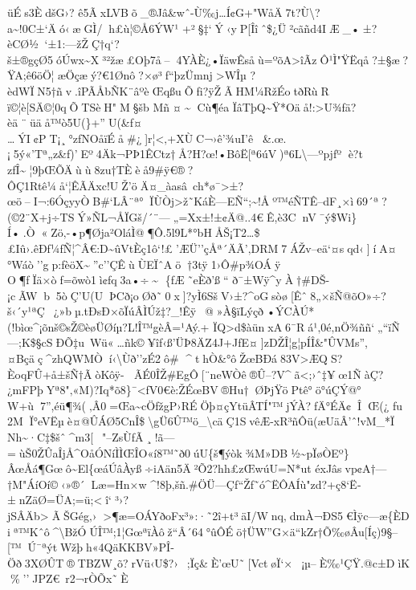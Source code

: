 üÉs3ÈdšG›?
ê5ÃxLVBõ\_®Jâ\&wˆ-Ù‰j\ldots Í¢G+"WåÄ7t?Ù\textbackslash?a\textasciitilde!0C±`Äó‹æGÌ/h£ù¦©Å6ÝW¹
+²§‡`Ý‹\textbar yP{[}Îîˆ\$¿Ü²cãñd4IÆ\_•±?èCØ½`±1:---žŽÇ†q`?š±®gçØ5óÚwx\textasciitilde X³²žæ£Oþ7å--4YÀÈ¿•ÏäwÊsåù=ºõA\textgreater îÃzÔ¹Ì"ŸËqå?±§æ?ŸA;ê6öÖ¦æÖçæý?€1Ønô?×ø³ ƒ``þzÜmnj\textgreater WÎµ
?èdWÏN5†ñv.îPÃÅbÑK¨âºèŒqßuÕƒi?ÿŽÃHM¼RžÉotðRùR ï©¦è{[}SÄ©¦0qÕTSèH"M§šb
Mñ¤\textasciitildeCù¶éa
ÏâTþQ\textasciitilde\textquotesingle Ÿ*Oäå!:\textgreater U¾fä?èä¨üäå™ò5U(\}+''U(\&f¤
\ldots*Ý I¢PT¡¸°zƒNOåïÉå\#¿{]}r¦\textless‚+XÙC¬›ê'¾uI'ê\&.œ.¡5ý«'T ª„z\&ƒ)'Eº4Äk¬PÞ1ÊCtz†Å?H?œ!•BôË{[}ª6úV)ª6L\textbackslash---ºpjƒº
è?t
zƒÎ\textasciitilde{}¦9þŒÕÄùù8zu†TÈèå9\#ÿ€®?ÔÇ1R\textquotesingle tê¼å`¦ÊÃÄxc!UŽ'öÄ¤\_àasâ~ch*ø¯\textgreater±?œö--I¬:6ÓçyyÒB\#`LÂ¨ª°ÏÙÒj\textgreater ž˜KáÈ---EÑ``;\textasciitilde!Åº™éÑTÊ--dF¸×ì69´ª?(©2¨X+j÷TSÝ»ÑL¬ÅÏGš/´¨---„=Xx±!±¢Ä@..4€Ê,è3CnV¯ý\$Wi\}Í•.Ò«Zö‚-•p¶Øja²OláÌ@¶Ô.5l9L*°bHÅŠ¡T2\ldots\$£Iû›.êÐf¼ƒÑ¦\^{}Â€:D\textasciitilde ûVtÈç1ô`!£'ÆÜ''çÅª´ÄÃ'‚DRM7ÁŽv--eä`¤sqd‹{]}íA¤°Wáò''gp:ƒèöX\textasciitilde''c''ÇÊùÙEÏˆAö†3tÿ1›Ô\#p¾OÁÿ
O¶fÏä×òƒ=õwò1ì¢fq3a•÷\textasciitilde{} \{ƒÆ˜eÈð'ß``
ð¯±Wÿ\^{}yÀ†\#DŠ-¡cÃWb5òÇ'U(UÞCð¡oØð˜0x{]}?yÌ6SšV›±?\^{}oGsòø{[}Êˆ8„×šÑ@õO»÷?š‹´y¹ªÇ~¿»bµ.tÐsÐ×õÏúÂÌÚž‡?\_!Êÿ~@» À§ïLýçð•ÝCÀÚ*(!bìœ\^{}¡õnš©sŽ©èøÜ\textbar Øíµ?L!Î™gèÂ=¹Aý.+
ÏQ\textgreater d\$àünxA6¯Rá¹‚0é‚nÖ¾ññ`„``ïÑ---;K\$§cSÐÕ‡u~Wü«\ldots ñk©¥îf‹ß'ÜÞ8ÄZ4J+JfE¤{]}zDŽÎ¦g¦pÍÎ\&"ÛVMs'',¤Bçäç\^{}zhQWMÒí‹\textbackslash Ùð''zÉ2ô\#
­\^{}th\textbar Ò\&°ôŽ œBÐá83V\textgreater ÆQ S?ÈoqFÛ+å±šÑ†ÃòKôÿ-
ÃÉ0ÎŽ\#EgÔ{[}¨neWÒê®Û--?V\^{}ã\textless;›ˆ‡¥œ1ÑàÇ?¿mFPþYª8"‚«M)?Iq*õ8\}¯\textless ƒV0€è:ŽÉœBV®Hu†ØÞjŸöPtê°ö°úÇÝ@°
W+ù7'',éü¶¾(‚Â0=Œa\textasciitilde cÖƒžgP›RÉÖþ¤çYtüÂTÍ"™jÝÀ?fÄ°ÉÄ¢ÎŒ(¿ fu
2M Ï°eVËµè¤@ÛÁØ5CnÎ\$\textbackslash gÜ6\textbar Û™ö\_\textbackslash cäÇ1SvêÆ-xR³ñÔü(æUäÂ'ˆ!vM\_*Ï
Nh\textasciitilde·C‡\$šˆ\^{}m3{[}~"--ZsÙfÃ¸!ã---=ùŠ0 ŽÛaÎjÅ\^{}OåÓNíÌÌŒÎO«í8™˜ð0úU\{š¶ýòk¾M»DB½\textasciitilde pÏøÒEº\}ÂœÅá¶Gœô\textasciitilde El\{œáÚâÀyß÷iAän5Ä²Õ2?hh£zŒwúU=N*ut
éxJâsvp¢A†---†M"ÁíOí©‹»®´Læ=Hn×w
\^{}!8þ‚šñ.\#ÖÜ---Çf\textbar``Žƒ˜ó\^{}ËÔAÍù"zd?+ç8`Ë­±nZäØ=ÜA;=ü;\textless­î`³›?jSÂÄb\textgreaterÃŠGég‚›\textgreater¶æ=OÁYðoFx³»:·˜2î+t³äI/Wnq‚dmÀ¬ÐS5€Ìÿc---æ\{ÈD
iª™Kˆô\^{}\textbackslash BžÓÚÎ™;1¦GœªïÀôž``Â´64°ûÔÉö†ÜW''G×ä``kZr†Õ‰øÂu{[}Íç)9§--{[}™Ú¯ªýtWžþh«4QäKKBV»\textbar PÎ­Öð3XØÛT®TBZW¸õ?rVü‹U\$?›~;Ïç\&È'œU˜{[}VctøÏ`×~¡µ--È‰¹ÇŸ.@c±DìK\%''JPZ€~r2¬rÒÕx˜È
